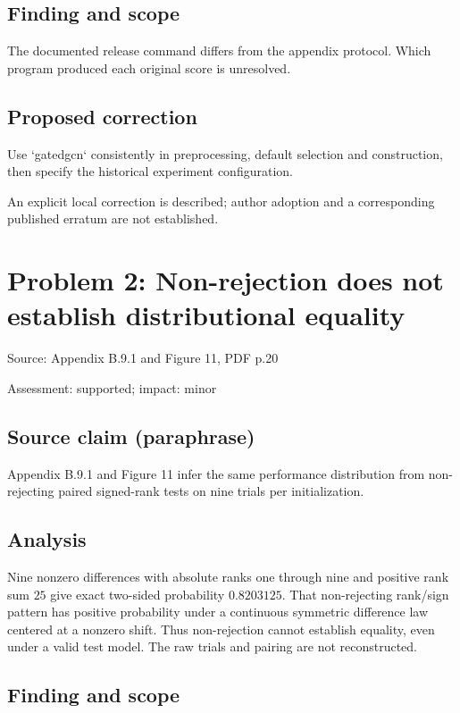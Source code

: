 \documentclass[11pt]{article}
\begin{document}
\subsection*{Finding and scope}

The documented release command differs from the appendix protocol. Which program produced each original score is unresolved.

\subsection*{Proposed correction}

Use `gatedgcn` consistently in preprocessing, default selection and construction, then specify the historical experiment configuration.

An explicit local correction is described; author adoption and a corresponding published erratum are not established.

\section*{Problem 2: Non-rejection does not establish distributional equality}

Source: Appendix B.9.1 and Figure 11, PDF p.20

Assessment: supported; impact: minor

\subsection*{Source claim (paraphrase)}

Appendix B.9.1 and Figure 11 infer the same performance distribution from non-rejecting paired signed-rank tests on nine trials per initialization.

\subsection*{Analysis}

Nine nonzero differences with absolute ranks one through nine and positive rank sum \(25\) give exact two-sided probability \(0.8203125\). That non-rejecting rank/sign pattern has positive probability under a continuous symmetric difference law centered at a nonzero shift. Thus non-rejection cannot establish equality, even under a valid test model. The raw trials and pairing are not reconstructed.

\subsection*{Finding and scope}
\end{document}
